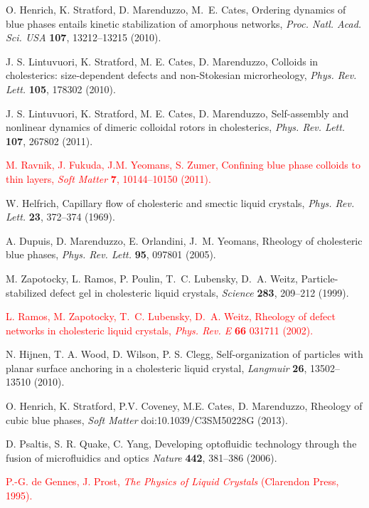 \documentclass[12pt]{article}
\begin{document}
\begin{thebibliography}{99}
O. Henrich, K. Stratford, D. Marenduzzo, M.~E. Cates,
Ordering dynamics of blue phases entails kinetic stabilization of amorphous
networks, {\it Proc. Natl. Acad. Sci. USA} {\bf 107}, 13212--13215 (2010).

J. S. Lintuvuori, K. Stratford, M. E. Cates, D. Marenduzzo,
Colloids in cholesterics: size-dependent defects and non-Stokesian
microrheology, {\it Phys. Rev. Lett.} {\bf 105}, 178302 (2010).

J. S. Lintuvuori, K. Stratford, M. E. Cates, D. Marenduzzo,
Self-assembly and nonlinear dynamics of dimeric colloidal rotors in 
cholesterics, {\it Phys. Rev. Lett.} {\bf 107}, 267802 (2011).

\textcolor{red}{M. Ravnik, J. Fukuda, J.M. Yeomans, S. Zumer,
Confining blue phase colloids to thin layers,
{\it Soft Matter} {\bf 7}, 10144--10150 (2011).}

 	W. Helfrich,
Capillary flow of cholesteric and smectic liquid crystals,
{\it Phys. Rev. Lett.} {\bf 23}, 372--374 (1969).

A. Dupuis, D. Marenduzzo, E. Orlandini, J.~M. Yeomans,
Rheology of cholesteric blue phases,
{\it Phys. Rev. Lett.} {\bf 95}, 097801 (2005).

M. Zapotocky, L. Ramos, P. Poulin, T.~C. Lubensky,  D.~A. Weitz,
Particle-stabilized defect gel in cholesteric liquid crystals,
{\it Science} {\bf 283}, 209--212 (1999).

\textcolor{red}{L. Ramos, M. Zapotocky, T.~C. Lubensky, D.~A. Weitz, Rheology of defect networks in cholesteric liquid crystals, {\it Phys. Rev. E} {\bf 66} 031711 (2002).}

 N. Hijnen, T. A. Wood, D. Wilson, P. S. Clegg, 
Self-organization of particles with planar surface anchoring in a cholesteric
liquid crystal, {\it Langmuir} {\bf 26}, 13502--13510 (2010).

O. Henrich, K. Stratford, P.V. Coveney, M.E. Cates, D. Marenduzzo,
Rheology of cubic blue phases,
{\it Soft Matter} doi:10.1039/C3SM50228G (2013).

 D. Psaltis, S. R. Quake, C. Yang,
Developing optofluidic technology through the fusion of microfluidics and
optics {\it Nature} {\bf 442}, 381--386 (2006).

\textcolor{red}{P.-G. de Gennes, J. Prost,
{\it The Physics of Liquid Crystals} (Clarendon Press, 1995).}


\end{thebibliography}
\end{document}
